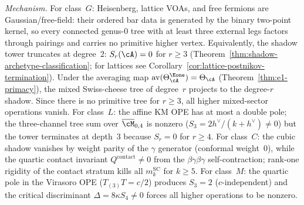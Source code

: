 \begin{proposition}
\medskip\noindent
\emph{Mechanism.}
For class~$G$\textup{:}
Heisenberg, lattice VOAs, and free fermions are Gaussian/free-field:
their ordered bar data is generated by the binary two-point kernel,
so every connected genus-$0$ tree with at least three external legs
factors through pairings and carries no primitive higher vertex.
Equivalently, the shadow tower truncates at degree~$2$:
$S_r(\cA)=0$ for $r \geq 3$
\textup{(}Theorem~\ref{thm:shadow-archetype-classification}; for
lattices see Corollary~\ref{cor:lattice-postnikov-termination}\textup{)}.
Under the averaging map
$\operatorname{av}(\Theta_\cA^{\Eone}) = \Theta_\cA$
\textup{(}Theorem~\ref{thm:e1-primacy}\textup{)},
the mixed Swiss-cheese tree of degree~$r$ projects to the degree-$r$
shadow. Since there is no primitive tree for $r \geq 3$,
all higher mixed-sector operations vanish.
For class~$L$\textup{:} the affine KM OPE has at most a double pole; the
three-channel tree sum over $\overline{\cM}_{0,4}$ is nonzero
\textup{(}$S_3 = 2h^\vee/(k+h^\vee) \neq 0$\textup{)} but the
tower terminates at depth~$3$ because $S_r = 0$ for $r \geq 4$.
For class~$C$\textup{:}
the cubic shadow vanishes by weight parity of the $\gamma$
generator \textup{(}conformal weight~$0$\textup{)}, while the
quartic contact invariant
$Q^{\mathrm{contact}} \neq 0$ from the
$\beta\gamma\beta\gamma$ self-contraction; rank-one rigidity of
the contact stratum kills all $m_k^{\mathrm{SC}}$ for $k \geq 5$.
For class~$M$\textup{:}
the quartic pole in the Virasoro OPE
\textup{(}$T_{(3)}T = c/2$\textup{)} produces $S_3 = 2$
\textup{(}$c$-independent\textup{)} and the critical discriminant
$\Delta = 8\kappa S_4 \neq 0$ forces all higher operations to be
nonzero.
\end{proposition}

